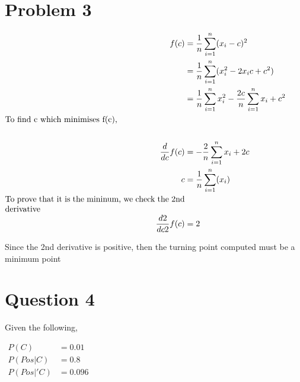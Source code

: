 \documentclass[12pt]{article}
\begin{document}
\newpage

\section*{Problem 3}

\begin{center}
    $
        \begin{alignedat}{2}
            f(c)                 & = \frac{1}{n} \sum_{i=1}^{n} (x_i - c)^2                                   \\
                                 & = \frac{1}{n} \sum_{i=1}^{n} (x_i^2 -2x_i c + c^2)                         \\
                                 & = \frac{1}{n} \sum_{i=1}^{n} x_i^2 - \frac{2c}{n} \sum_{i=1}^{n} x_i + c^2 \\
            \parbox{3in}{To find c which minimises f(c),}                                                     \\                                                                    \\
            \frac{d }{dc} f(c)   & = - \frac{2}{n} \sum_{i=1}^{n} x_i + 2c                                    \\
            c                    & = \frac{1}{n} \sum_{i=1}^{n}(x_i)                                          \\
            \parbox{3in}{To prove that it is the mininum, we check the 2nd derivative}                        \\
            \frac{d2 }{dc2} f(c) & = 2
        \end{alignedat}
    $
\end{center}

Since the 2nd derivative is positive, then the turning point computed
must be a minimum point

\newpage

\section*{Question 4}

Given the following,
\begin{center}
    $
        \begin{alignedat}{1}
            P (C)      & = 0.01  \\
            P (Pos|C)  & = 0.8   \\
            P (Pos|'C) & = 0.096 \\
        \end{alignedat}
    $
\end{center}
\end{document}
